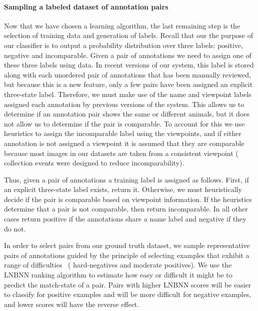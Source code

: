     \paragraph{Sampling a labeled dataset of annotation pairs}
    Now that we have chosen a learning algorithm, the last remaining step is the selection of training data and
      generation of labels.
    Recall that our the purpose of our classifier is to output a probability distribution over three labels:
    positive, negative and incomparable.
    Given a pair of annotations we need to assign one of these three labels using \groundtruth{} data.
    In recent versions of our system, this \groundtruth{} label is stored along with each unordered pair of
      annotations that has been manually reviewed, but because this is a new feature, only a few pairs have been
      assigned an explicit three-state label.
    Therefore, we must make use of the name and viewpoint labels assigned each annotation by previous versions of
      the system.
    This allows us to determine if an annotation pair shows the same or different animals, but it does not allow
      us to determine if the pair is comparable.
    To account for this we use heuristics to assign the incomparable label using the viewpoints, and if either
      annotation is not assigned a viewpoint it is assumed that they are comparable because most images in our
      datasets are taken from a consistent viewpoint (\ie{} collection events were designed to reduce
      incomparability).

    Thus, given a pair of annotations a training label is assigned as follows.
    First, if an explicit three-state label exists, return it.
    Otherwise, we must heuristically decide if the pair is comparable based on viewpoint information.
    If the heuristics determine that a pair is not comparable, then return incomparable.
    In all other cases return positive if the annotations share a name label and negative if they do not.

    In order to select pairs from our ground truth dataset, we sample representative pairs of annotations guided
      by the principle of selecting examples that exhibit a range of difficulties~\cite{shi_embedding_2016} (\eg
      hard-negatives and moderate positives).
    We use the LNBNN ranking algorithm to estimate how easy or difficult it might be to predict the match-state
      of a pair.
    Pairs with higher LNBNN scores will be easier to classify for positive examples and will be more difficult
      for negative examples, and lower scores will have the reverse effect.


